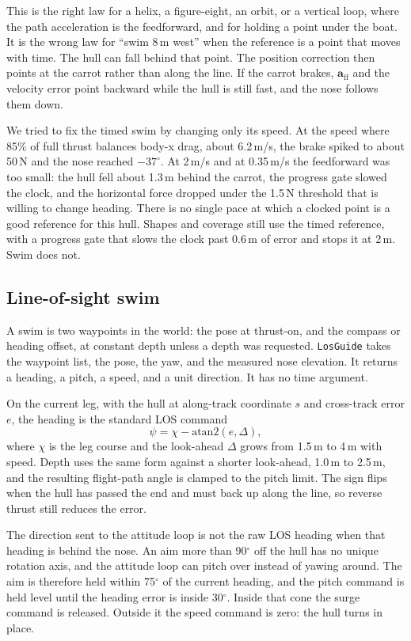 \documentclass[conference]{IEEEtran}
\begin{document}
This is the right law for a helix, a figure-eight, an orbit, or a vertical loop, where the path acceleration is the feedforward, and for holding a point under the boat. It is the wrong law for ``swim 8\,m west'' when the reference is a point that moves with time. The hull can fall behind that point. The position correction then points at the carrot rather than along the line. If the carrot brakes, $\mathbf{a}_{\mathrm{ff}}$ and the velocity error point backward while the hull is still fast, and the nose follows them down.

We tried to fix the timed swim by changing only its speed. At the speed where 85\% of full thrust balances body-x drag, about 6.2\,m/s, the brake spiked to about 50\,N and the nose reached $-37^\circ$. At 2\,m/s and at 0.35\,m/s the feedforward was too small: the hull fell about 1.3\,m behind the carrot, the progress gate slowed the clock, and the horizontal force dropped under the 1.5\,N threshold that is willing to change heading. There is no single pace at which a clocked point is a good reference for this hull. Shapes and coverage still use the timed reference, with a progress gate that slows the clock past 0.6\,m of error and stops it at 2\,m. Swim does not.

\subsection{Line-of-sight swim}
\label{sec:los}
A swim is two waypoints in the world: the pose at thrust-on, and the compass or heading offset, at constant depth unless a depth was requested. \texttt{LosGuide} takes the waypoint list, the pose, the yaw, and the measured nose elevation. It returns a heading, a pitch, a speed, and a unit direction. It has no time argument.

On the current leg, with the hull at along-track coordinate $s$ and cross-track error $e$, the heading is the standard LOS command
\begin{equation}
\psi = \chi - \mathrm{atan2}(e, \Delta),
\label{eq:los}
\end{equation}
where $\chi$ is the leg course and the look-ahead $\Delta$ grows from 1.5\,m to 4\,m with speed. Depth uses the same form against a shorter look-ahead, 1.0\,m to 2.5\,m, and the resulting flight-path angle is clamped to the pitch limit. The sign flips when the hull has passed the end and must back up along the line, so reverse thrust still reduces the error.

The direction sent to the attitude loop is not the raw LOS heading when that heading is behind the nose. An aim more than 90$^\circ$ off the hull has no unique rotation axis, and the attitude loop can pitch over instead of yawing around. The aim is therefore held within 75$^\circ$ of the current heading, and the pitch command is held level until the heading error is inside 30$^\circ$. Inside that cone the surge command is released. Outside it the speed command is zero: the hull turns in place.
\end{document}
